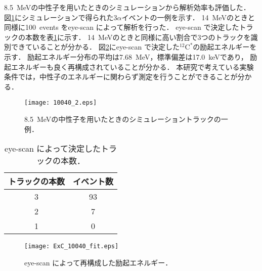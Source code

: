 \documentclass[../master]{subfiles}
\begin{document}
\SI{8.5}{\mega\electronvolt}の中性子を用いたときのシミュレーションから解析効率も評価した．
図\ref{fig::three_alpha_low_En}にシミュレーションで得られた3$\alpha$イベントの一例を示す．
\SI{14}{\mega\electronvolt}のときと同様に100~events をeye-scan によって解析を行った．
eye-scan で決定したトラックの本数を表\ref{tab::eye-scan_low}に示す．
\SI{14}{\mega\electronvolt}のときと同様に高い割合で3つのトラックを識別できていることが分かる．
図\ref{fig::ExC_low}にeye-scan で決定した${}^{12}\mathrm{C}^{*}$の励起エネルギーを示す．
励起エネルギー分布の平均は\SI{7.68}{\mega\electronvolt}，標準偏差は\SI{17.0}{\kilo\electronvolt}であり，
励起エネルギーも良く再構成されていることが分かる．
本研究で考えている実験条件では，中性子のエネルギーに関わらず測定を行うことができることが分かる．
\begin{figure}
  \centering
  \texttt{[image: 10040\_2.eps]}
  \caption{\SI{8.5}{\mega\electronvolt}の中性子を用いたときのシミュレーショントラックの一例．}
  \label{fig::three_alpha_low_En}
\end{figure}
\begin{table}
  \caption{eye-scan によって決定したトラックの本数．}
  \label{tab::eye-scan_low}
  \centering
  \begin{tabular}{cc}
    \toprule
    トラックの本数 & イベント数 \\
    \midrule
    3 & 93 \\
    2 & 7 \\
    1 & 0 \\
    \bottomrule
  \end{tabular}
\end{table}
\begin{figure}
  \centering
  \texttt{[image: ExC\_10040\_fit.eps]}
  \caption{eye-scan によって再構成した励起エネルギー．}
  \label{fig::ExC_low}
\end{figure}
\end{document}
